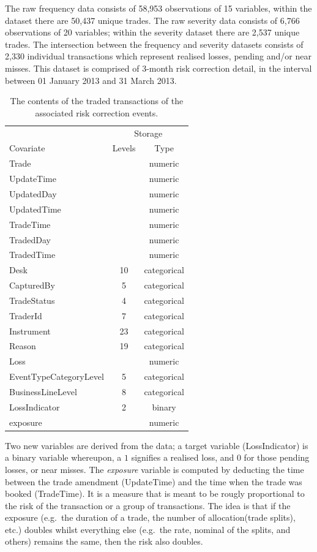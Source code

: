\documentclass{DissertateUSU}
\begin{document}
The raw frequency data consists of 58,953 observations of 15 variables,
within the dataset there are 50,437 unique trades. The raw severity data
consists of 6,766 observations of 20 variables; within the severity
dataset there are 2,537 unique trades. The intersection between the
frequency and severity datasets consists of 2,330 individual
transactions which represent realised losses, pending and/or near
misses. This dataset is comprised of 3-month risk correction detail, in
the interval between 01 January 2013 and 31 March 2013. \medskip

\begin{table}[ht]
\centering
\caption{The contents of the traded transactions of the associated risk correction events.}
\begin{tabular}{lcc}
\toprule
  & \multicolumn{2}{c}{Storage} \\
Covariate     & Levels   & Type \\ 
\midrule
 Trade       &          & numeric \\
 UpdateTime  &          & numeric \\
 UpdatedDay  &          & numeric \\
 UpdatedTime &          & numeric \\
 TradeTime   &          & numeric \\
 TradedDay   &          & numeric \\
 TradedTime  &          & numeric \\
 Desk        &  10      & categorical \\
 CapturedBy  &  5       & categorical \\
 TradeStatus &  4       & categorical \\
 TraderId    &  7       & categorical \\
 Instrument  &  23      & categorical \\
 Reason      &  19      & categorical \\
 Loss        &          & numeric \\
 EventTypeCategoryLevel & 5  & categorical \\
 BusinessLineLevel      & 8  & categorical \\
 LossIndicator          & 2  & binary \\
 exposure               &    & numeric \\
 \bottomrule
\end{tabular}\label{tab_contents}
\end{table}

Two new variables are derived from the data; a target variable
(LossIndicator) is a binary variable whereupon, a \(1\) signifies a
realised loss, and \(0\) for those pending losses, or near misses. The
\emph{exposure} variable is computed by deducting the time between the
trade amendment (UpdateTime) and the time when the trade was booked
(TradeTime). It is a measure that is meant to be rougly proportional to
the risk of the transaction or a group of transactions. The idea is that
if the exposure (e.g.~the duration of a trade, the number of
allocation(trade splits), etc.) doubles whilst everything else (e.g.~the
rate, nominal of the splits, and others) remains the same, then the risk
also doubles.\medskip
\end{document}
